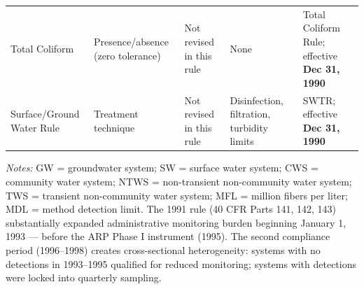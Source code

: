 \begin{table}[htbp]
\begin{tabular}{p{2.5cm}p{3cm}p{5.5cm}p{2.5cm}p{2.5cm}}
\addlinespace
Total Coliform & Presence/absence (zero tolerance) & Not revised in this rule & None & Total Coliform Rule; effective \textbf{Dec 31, 1990} \\
\addlinespace
Surface/Ground Water Rule & Treatment technique & Not revised in this rule & Disinfection, filtration, turbidity limits & SWTR; effective \textbf{Dec 31, 1990} \\
\bottomrule
\end{tabular}
\begin{tablenotes}
\small
\item \textit{Notes:} GW = groundwater system; SW = surface water system; CWS = community water system; NTWS = non-transient non-community water system; TWS = transient non-community water system; MFL = million fibers per liter; MDL = method detection limit. The 1991 rule (40 CFR Parts 141, 142, 143) substantially expanded administrative monitoring burden beginning January 1, 1993 --- before the ARP Phase I instrument (1995). The second compliance period (1996--1998) creates cross-sectional heterogeneity: systems with no detections in 1993--1995 qualified for reduced monitoring; systems with detections were locked into quarterly sampling.
\end{tablenotes}
\end{table}
